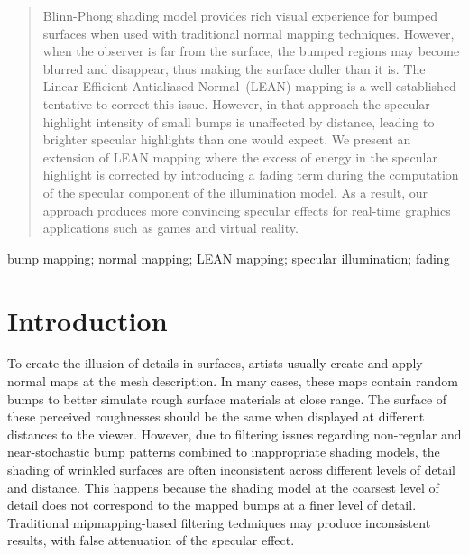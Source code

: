 \documentclass[10pt, conference]{IEEEtran}
\begin{document}
\begin{abstract}
  Blinn-Phong shading model provides rich visual experience for bumped surfaces when used with traditional normal mapping techniques. However, when the observer is far from the surface, the bumped regions may become blurred and disappear, thus making the surface duller than it is. The Linear Efficient Antialiased Normal~(LEAN) mapping is a well-established tentative to correct this issue. However, in that approach the specular highlight intensity of small bumps is unaffected by distance, leading to brighter specular highlights than one would expect. We present an extension of LEAN mapping where the excess of energy in the specular highlight is corrected by introducing a fading term during the computation of the specular component of the illumination model. As a result, our approach produces more convincing specular effects for real-time graphics applications such as games and virtual reality.
\end{abstract}

\begin{IEEEkeywords}
  bump mapping; normal mapping; LEAN mapping; specular illumination; fading
\end{IEEEkeywords}


\IEEEpeerreviewmaketitle





\section{Introduction}
%
To create the illusion of details in surfaces, artists usually create and apply normal maps at the mesh description. In many cases, these maps contain random bumps to better simulate rough surface materials at close range. The surface of these perceived roughnesses should be the same when displayed at different distances to the viewer. However, due to filtering issues regarding non-regular and near-stochastic bump patterns combined to inappropriate shading models, the shading of wrinkled surfaces are often inconsistent across different levels of detail and distance. This happens because the shading model at the coarsest level of detail does not correspond to the mapped bumps at a finer level of detail. Traditional mipmapping-based filtering techniques may produce inconsistent results, with false attenuation of the specular effect.
\end{document}
